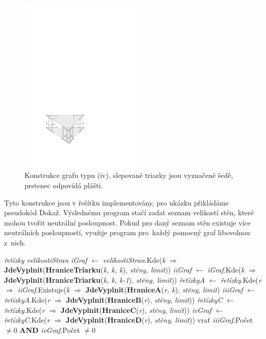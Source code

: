 \begin{figure}[h]\centering
\includegraphics[width = 60mm]{../img/iv-construction}
\caption{Konstrukce grafu typu (iv), slepované triarky jsou vyznačené šedě, prstenec odpovídá plášti.}
\label{obr03:konstrukceiv}
\end{figure}

Tyto konstrukce jsou v řešítku implementovány, pro ukázku přikládáme pseudokód Dokaž. Výslednému program stačí zadat seznam velikostí stěn, které mohou tvořit neutrální posloupnost. Pokud pro daný seznam stěn existuje více neutrálních posloupností, využije program pro~každý pomocný graf libovolnou z~nich.


\begin{algorithm}
\label{alg:dokaz}
\begin{algorithmic}
\State \textit{řetízky} 
\State \textit{velikostiStran} 
\State 
\State \textit{iGraf} $\gets$ \textit{velikostiStran}.Kde(\textit{k} $\Rightarrow$ \textbf{JdeVyplnit}(\textbf{HraniceTriarku}(\textit{k, k, k}), \textit{stěny, limit}))
\State \textit{iiGraf} $\gets$ \textit{iGraf}.Kde(\textit{k} $\Rightarrow$ \textbf{JdeVyplnit}(\textbf{HraniceTriarku}(\textit{k, k, k-1}), \textit{stěny, limit}))
\State \textit{řetízkyA} $\gets$ \textit{řetízky}.Kde(\textit{r} $\Rightarrow$ \textit{iiGraf}.Existuje(\textit{k} $\Rightarrow$ \textbf{JdeVyplnit}(\textbf{HraniceA}(\textit{r, k}), \textit{stěny}, \textit{limit})
\State \textit{iiiGraf} $\gets$ \textit{řetízkyA}.Kde(\textit{r} $\Rightarrow$ \textbf{JdeVyplnit}(\textbf{HraniceB}(\textit{r}), \textit{stěny}, \textit{limit}))
\State \textit{řetízkyC} $\gets$ \textit{řetízky}.Kde(\textit{r} $\Rightarrow$ \textbf{JdeVyplnit}(\textbf{HraniceC}(\textit{r}), \textit{stěny}, \textit{limit}))
\State \textit{ivGraf} $\gets$ \textit{řetízkyC}.Kde(\textit{r} $\Rightarrow$ \textbf{JdeVyplnit}(\textbf{HraniceD}(\textit{r}), \textit{stěny}, \textit{limit}))
\State 
\State vrať \textit{iiiGraf}.Počet $ \neq 0$ \textbf{AND} \textit{ivGraf}.Počet $\neq 0$

\EndProcedure

\end{algorithmic}
\end{algorithm}


